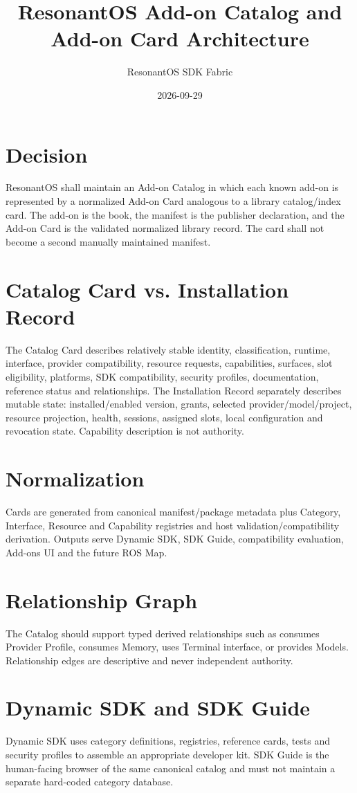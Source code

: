 \documentclass{article}
\title{ResonantOS Add-on Catalog and Add-on Card Architecture}
\author{ResonantOS SDK Fabric}
\date{2026-09-29}
\begin{document}
\maketitle
\section{Decision}
ResonantOS shall maintain an Add-on Catalog in which each known add-on is represented by a normalized Add-on Card analogous to a library catalog/index card. The add-on is the book, the manifest is the publisher declaration, and the Add-on Card is the validated normalized library record. The card shall not become a second manually maintained manifest.

\section{Catalog Card vs. Installation Record}
The Catalog Card describes relatively stable identity, classification, runtime, interface, provider compatibility, resource requests, capabilities, surfaces, slot eligibility, platforms, SDK compatibility, security profiles, documentation, reference status and relationships. The Installation Record separately describes mutable state: installed/enabled version, grants, selected provider/model/project, resource projection, health, sessions, assigned slots, local configuration and revocation state. Capability description is not authority.

\section{Normalization}
Cards are generated from canonical manifest/package metadata plus Category, Interface, Resource and Capability registries and host validation/compatibility derivation. Outputs serve Dynamic SDK, SDK Guide, compatibility evaluation, Add-ons UI and the future ROS Map.

\section{Relationship Graph}
The Catalog should support typed derived relationships such as consumes Provider Profile, consumes Memory, uses Terminal interface, or provides Models. Relationship edges are descriptive and never independent authority.

\section{Dynamic SDK and SDK Guide}
Dynamic SDK uses category definitions, registries, reference cards, tests and security profiles to assemble an appropriate developer kit. SDK Guide is the human-facing browser of the same canonical catalog and must not maintain a separate hard-coded category database.
\end{document}
